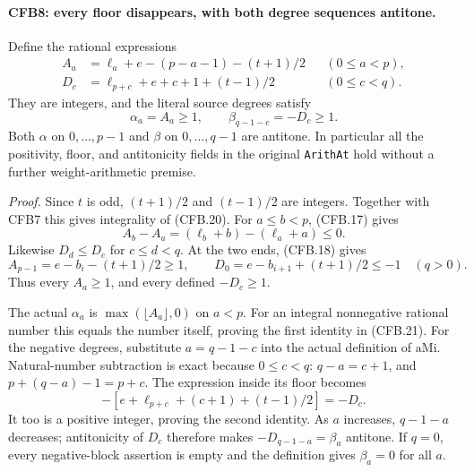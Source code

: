 \paragraph{CFB8: every floor disappears, with both degree sequences antitone.}
\label{claim:CFB8}
Define the rational expressions
\[
 \begin{aligned}
 A_a&=\ell_a+e-(p-a-1)-(t+1)/2 &&(0\le a<p),\\
 D_c&=\ell_{p+c}+e+c+1+(t-1)/2 &&(0\le c<q).
 \end{aligned}                                                  \tag{CFB.20}
\]
They are integers, and the literal source degrees satisfy
\[
       \alpha_a=A_a\ge1,\qquad
       \beta_{q-1-c}=-D_c\ge1.                                \tag{CFB.21}
\]
Both \(\alpha\) on \(0,\ldots,p-1\) and \(\beta\) on
\(0,\ldots,q-1\) are antitone.  In particular all the positivity,
floor, and antitonicity fields in the original \texttt{ArithAt}
hold without a further weight-arithmetic premise.

\emph{Proof.}
Since \(t\) is odd, \((t+1)/2\) and \((t-1)/2\) are integers.
Together with CFB7 this gives integrality of (CFB.20).
For \(a\le b<p\), (CFB.17) gives
\[
 A_b-A_a=(\ell_b+b)-(\ell_a+a)\le0.
\]
Likewise \(D_d\le D_c\) for \(c\le d<q\).
At the two ends, (CFB.18) gives
\[
 A_{p-1}=e-b_i-(t+1)/2\ge1,
 \qquad D_0=e-b_{i+1}+(t+1)/2\le-1\quad(q>0).
                                                               \tag{CFB.22}
\]
Thus every \(A_a\ge1\), and every defined \(-D_c\ge1\).

The actual \(\alpha_a\) is
\(\max(\lfloor A_a\rfloor,0)\) on \(a<p\).
For an integral nonnegative rational number this equals the number
itself, proving the first identity in (CFB.21).
For the negative degrees, substitute \(a=q-1-c\) into the actual
definition of \(\mathrm{aMi}\).  Natural-number subtraction is
exact because \(0\le c<q\): \(q-a=c+1\), and
\(p+(q-a)-1=p+c\).  The expression inside its floor becomes
\[
          -[e+\ell_{p+c}+(c+1)+(t-1)/2]=-D_c.
\]
It too is a positive integer, proving the second identity.
As \(a\) increases, \(q-1-a\) decreases; antitonicity of
\(D_c\) therefore makes \(-D_{q-1-a}=\beta_a\) antitone.
If \(q=0\), every negative-block assertion is empty and the
definition gives \(\beta_a=0\) for all \(a\).

